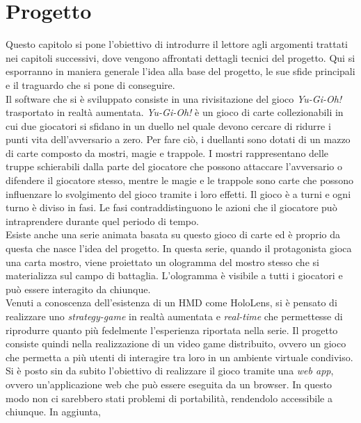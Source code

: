 \chapter{Progetto}\label{chap:Progetto}
Questo capitolo si pone l'obiettivo di introdurre il lettore agli argomenti trattati nei capitoli successivi, dove vengono affrontati dettagli tecnici del progetto. Qui si esporranno
in maniera generale l'idea alla base del progetto, le sue sfide principali e il traguardo che si pone di conseguire.\\
\newline
Il software che si è sviluppato consiste in una rivisitazione del gioco \textit{Yu-Gi-Oh!} trasportato in realtà aumentata. \textit{Yu-Gi-Oh!} è un gioco di 
carte collezionabili in cui due giocatori si sfidano in un duello nel quale devono cercare di ridurre i punti vita dell'avversario a zero. Per fare ciò, i duellanti sono dotati di un
mazzo di carte composto da mostri, magie e trappole. I mostri rappresentano delle truppe schierabili dalla parte del giocatore che possono attaccare l'avversario o difendere il
giocatore stesso, mentre le magie e le trappole sono carte che possono influenzare lo svolgimento del gioco tramite i loro effetti. Il gioco è a turni e ogni turno è diviso in fasi. Le 
fasi contraddistinguono le azioni che il giocatore può intraprendere durante quel periodo di tempo.\\
\newline
Esiste anche una serie animata basata su questo gioco di carte ed è proprio da questa che nasce l'idea del progetto. In questa serie, quando il protagonista gioca una carta mostro, 
viene proiettato un ologramma del mostro stesso che si materializza sul campo di battaglia. L'ologramma è visibile a tutti i giocatori e può essere interagito da chiunque.\\
Venuti a conoscenza dell'esistenza di un HMD come HoloLens, si è pensato di realizzare uno \textit{strategy-game} in realtà aumentata e \textit{real-time} che permettesse di riprodurre 
quanto più fedelmente l'esperienza riportata nella serie.
\newline
Il progetto consiste quindi nella realizzazione di un video game distribuito, ovvero un gioco che permetta a più utenti di interagire tra loro in un ambiente virtuale condiviso. 
Si è posto sin da subito l'obiettivo di realizzare il gioco tramite una \textit{web app}, ovvero un'applicazione web
che può essere eseguita da un browser. In questo modo non ci sarebbero stati problemi di portabilità, rendendolo accessibile a chiunque. In aggiunta, 

